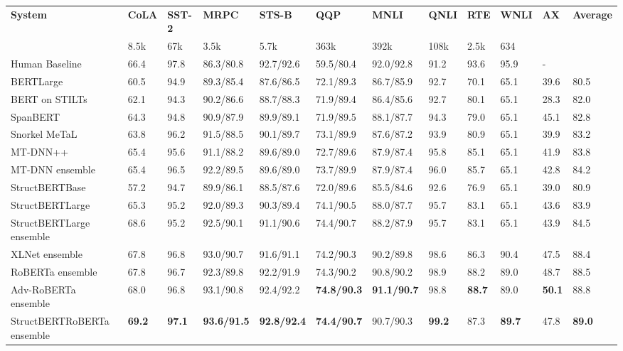 \documentclass{article}
\begin{document}
\begin{table*}[ht]
\scriptsize\center
\begin{tabular}{l|l|l|l|l|l|l|l|l|l|l|l}
 \hline
\bf System & \bf CoLA & \bf SST-2 & \bf MRPC & \bf STS-B & \bf QQP & \bf MNLI & \bf QNLI & \bf RTE & \bf WNLI & \bf AX & \bf Average\\
 & 8.5k & 67k & 3.5k & 5.7k & 363k & 392k & 108k & 2.5k & 634 & \\
 \hline
 Human Baseline&	66.4&	97.8&	86.3/80.8&	92.7/92.6&	59.5/80.4&	92.0/92.8&	91.2&	93.6&	95.9&	-\\
 \hline
 BERT{\tiny Large}~\cite{devlin2018bert} &60.5 &	94.9 &	89.3/85.4 &	87.6/86.5 &	72.1/89.3 &	86.7/85.9 &	92.7 &	70.1 &	65.1 &	39.6  & 80.5\\
 BERT on STILTs~\cite{phang2018sentence}&	62.1&	94.3&	90.2/86.6&	88.7/88.3&	71.9/89.4&	86.4/85.6&	92.7&	80.1&	65.1&	28.3& 82.0\\
SpanBERT~\cite{joshi2019spanbert}& 64.3 & 94.8 & 90.9/87.9 & 89.9/89.1 & 71.9/89.5 & 88.1/87.7 & 
94.3 & 79.0 & 65.1 & 45.1 & 82.8 \\
 Snorkel MeTaL~\cite{ratner2017snorkel}&	63.8&	96.2&	91.5/88.5&	90.1/89.7&	73.1/89.9&	87.6/87.2&	93.9&	80.9&	65.1&	39.9& 83.2\\
 MT-DNN++~\cite{liu2019multi}&	65.4&	95.6&	91.1/88.2&	89.6/89.0&	72.7/89.6&	87.9/87.4&	95.8&	85.1&	65.1&	41.9& 83.8\\
 MT-DNN ensemble~\cite{liu2019multi}&	65.4&	96.5&	92.2/89.5&	89.6/89.0&	73.7/89.9&	87.9/87.4&	96.0&	85.7&	65.1&	42.8& 84.2\\
 \hline 
 StructBERT{\tiny Base}	&	57.2&	94.7&	89.9/86.1&	88.5/87.6&	72.0/89.6&	85.5/84.6	&92.6&	76.9&	65.1&	39.0&80.9 \\
 StructBERT{\tiny Large}&	65.3&	95.2&	92.0/89.3&	90.3/89.4&	74.1/90.5&	88.0/87.7	&95.7&	83.1&	65.1&	43.6& 83.9 \\
 StructBERT{\tiny Large} ensemble& 68.6&95.2& 92.5/90.1 &91.1/90.6 & 74.4/90.7 & 88.2/87.9 &95.7 &83.1
 & 65.1 &  43.9 &  84.5\\
 \hline
 XLNet ensemble~\cite{yang2019xlnet} & 67.8 & 96.8 & 93.0/90.7 & 91.6/91.1 & 74.2/90.3 & 90.2/89.8 & 98.6 & 86.3 & 90.4 & 47.5 & 88.4\\
 RoBERTa ensemble~\cite{liu2019roberta} & 67.8 & 96.7 & 92.3/89.8 & 92.2/91.9 & 74.3/90.2 &  90.8/90.2 & 98.9 &  88.2 & 89.0 &  48.7 & 88.5\\
 Adv-RoBERTa ensemble & 68.0 & 96.8 & 93.1/90.8 & 92.4/92.2 & {\bf 74.8/90.3} &
 {\bf 91.1/90.7} & 98.8 & {\bf 88.7} & 89.0 & {\bf 50.1} & 88.8 \\
 StructBERT{\tiny RoBERTa} ensemble & {\bf 69.2} & {\bf 97.1} & {\bf 93.6/91.5} & {\bf 92.8/92.4} & {\bf 74.4/90.7} &  90.7/90.3 & {\bf 99.2} & 87.3 & {\bf 89.7} & 47.8 & {\bf 89.0} \\
 \hline 
 

\end{tabular}
\end{table*}
\end{document}

